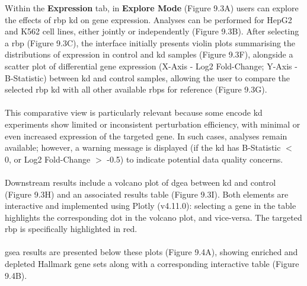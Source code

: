 Within the \textbf{Expression} tab, in \textbf{Explore Mode} (Figure 9.3A) users can explore the effects of \gls{rbp} \gls{kd} on gene expression. Analyses can be performed for HepG2 and K562 cell lines, either jointly or independently (Figure 9.3B). After selecting a \gls{rbp} (Figure 9.3C), the interface initially presents violin plots summarising the distributions of expression in control and \gls{kd} samples (Figure 9.3F), alongside a scatter plot of differential gene expression (X-Axis - Log2 Fold-Change; Y-Axis - B-Statistic) between \gls{kd} and control samples, allowing the user to compare the selected \gls{rbp} \gls{kd} with all other available \glspl{rbp} for reference (Figure 9.3G).
\\
\\
This comparative view is particularly relevant because some \gls{encode} \gls{kd} experiments show limited or inconsistent perturbation efficiency, with minimal or even increased expression of the targeted gene. In such cases, analyses remain available; however, a warning message is displayed (if the \gls{kd} has B-Statistic $<$ 0, or Log2 Fold-Change $>$ -0.5) to indicate potential data quality concerns.
\\
\\
Downstream results include a volcano plot of \gls{dgea} between \gls{kd} and control (Figure 9.3H) and an associated results table (Figure 9.3I). Both elements are interactive and implemented using Plotly (v4.11.0): selecting a gene in the table highlights the corresponding dot in the volcano plot, and vice-versa. The targeted \gls{rbp} is specifically highlighted in red.
\\
\\
\gls{gsea} results are presented below these plots (Figure 9.4A), showing enriched and depleted Hallmark gene sets\cite{liberzon_molecular_2015} along with a corresponding interactive table (Figure 9.4B).

